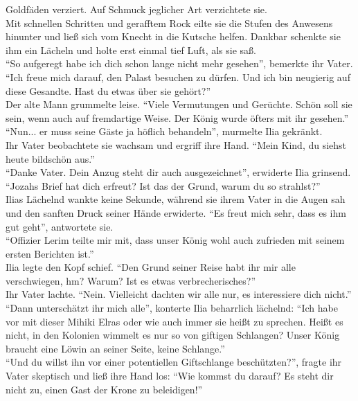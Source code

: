 Goldfäden verziert. Auf Schmuck jeglicher Art verzichtete sie. \\
Mit schnellen Schritten und gerafftem Rock eilte sie die Stufen des Anwesens hinunter und ließ sich 
vom Knecht in die Kutsche helfen. Dankbar schenkte sie ihm ein Lächeln und holte erst einmal tief 
Luft, als sie saß.\\
``So aufgeregt habe ich dich schon lange nicht mehr gesehen'', bemerkte ihr Vater.\\
``Ich freue mich darauf, den Palast besuchen zu dürfen. Und ich bin neugierig auf diese Gesandte. 
Hast du etwas über sie gehört?''\\
Der alte Mann grummelte leise. ``Viele Vermutungen und Gerüchte. Schön soll sie sein, wenn auch 
auf fremdartige Weise. Der König wurde öfters mit ihr gesehen.''\\
``Nun... er muss seine Gäste ja höflich behandeln'', murmelte Ilia gekränkt.\\
Ihr Vater beobachtete sie wachsam und ergriff ihre Hand. ``Mein Kind, du siehst heute bildschön 
aus.''\\
``Danke Vater. Dein Anzug steht dir auch ausgezeichnet'', erwiderte Ilia grinsend.\\
``Jozahs Brief hat dich erfreut? Ist das der Grund, warum du so strahlst?''\\
Ilias Lächelnd wankte keine Sekunde, während sie ihrem Vater in die Augen sah und den sanften Druck 
seiner Hände erwiderte. ``Es freut mich sehr, dass es ihm gut geht'', antwortete sie.\\
``Offizier Lerim teilte mir mit, dass unser König wohl auch zufrieden mit seinem ersten Berichten 
ist.''\\
Ilia legte den Kopf schief. ``Den Grund seiner Reise habt ihr mir alle verschwiegen, hm? Warum? Ist 
es etwas verbrecherisches?''\\
Ihr Vater lachte. ``Nein. Vielleicht dachten wir alle nur, es interessiere dich nicht.''\\
``Dann unterschätzt ihr mich alle'', konterte Ilia beharrlich lächelnd: ``Ich habe vor mit dieser 
Mihiki Elras oder wie auch immer sie heißt zu sprechen. Heißt es nicht, in den Kolonien wimmelt es 
nur so von giftigen Schlangen? Unser König braucht eine Löwin an seiner Seite, keine Schlange.''\\
``Und du willst ihn vor einer potentiellen Giftschlange beschützten?'', fragte ihr Vater skeptisch 
und ließ ihre Hand los: ``Wie kommst du darauf? Es steht dir nicht zu, einen Gast der Krone zu 
beleidigen!''\\
